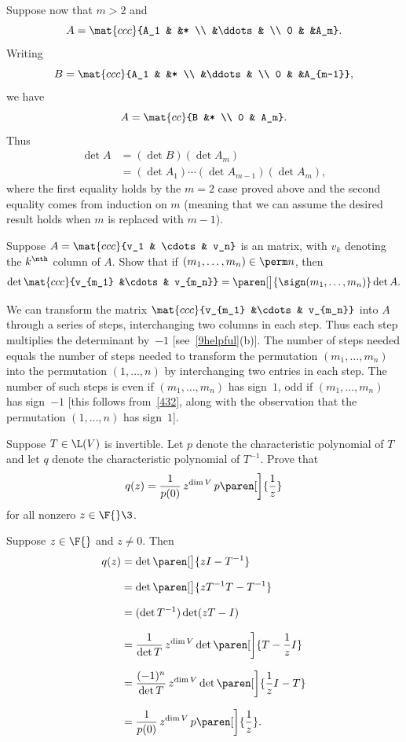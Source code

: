 \begin{Solution}
Suppose now that $m > 2$ and
\[
A = \mat{ccc}{A_1 & &* \\ &\ddots & \\ 0 & &A_m}.
\]
Writing
\[
B = \mat{ccc}{A_1 & &* \\ &\ddots & \\ 0 & &A_{m-1}},
\]
we have
\[
A = \mat{cc}{B &* \\ 0 & A_m}.
\]
Thus
\begin{align*}
\det A &= (\det B)(\det A_m) \\
&= (\det A_1) \dotsm (\det A_{m-1})(\det A_m),
\end{align*}
where the first equality holds by the $m = 2$ case proved above and the second
equality comes from induction on $m$ (meaning that we can assume the desired
result holds when $m$ is replaced with $m-1$).
\end{Solution}

\exercise
Suppose $A = \mat{ccc}{v_1 & \cdots & v_n}$ is an  matrix, with $v_k$ denoting the $k^\nth$ column of $A$. Show that if
$(m_1, \ldots, m_n) \in \perm n$, then
\[
\det \mat{ccc}{v_{m_1} &\cdots & v_{m_n}} = \paren[\big]{\sign(m_1, \ldots, m_n)} \det A.
\]
\exercisedisplayend

\begin{Solution}
We can transform the matrix $\mat{ccc}{v_{m_1} &\cdots & v_{m_n}}$ into $A$ through a series of steps, interchanging two columns in each step. Thus each step multiplies the determinant by~$-1$ [see~\ref{9helpful}(b)].  The number of steps needed equals the number of steps needed to transform the permutation $(m_1, \ldots, m_n)$ into the permutation $(1, \ldots, n)$ by interchanging two entries in each step.  The number of such steps is even if $(m_1, \ldots, m_n)$ has sign~$1$, odd if
$(m_1, \ldots, m_n)$ has sign~$-1$ [this follows from~\ref{432}, along with the observation that the permutation $(1, \ldots, n)$ has sign~$1$].
\end{Solution}

\exercise
Suppose $T \in \L(V)$ is invertible. Let $p$ denote the characteristic polynomial of $T$ and let $q$ denote the characteristic polynomial of $T^{-1}$. Prove that
\[
q(z) = \frac{1}{p(0)}\, z^{\dim V} \, p\paren[\bigg]{\frac{1}{z}}
\]
for all nonzero $z \in \F{}\3$.

\begin{Solution}
Suppose $z \in \F{}$ and $z \ne 0$. Then
\begin{align*}
q(z) &= \det\paren[\big]{zI - T^{-1}} \\[7bp]
&= \det \paren[\big]{ z T^{-1} T - T^{-1} }\\[7bp]
&= (\det T^{-1}) \det(zT - I) \\[7bp]
&= \frac{1}{\det T} \, z^{\dim V} \det \paren[\bigg]{ T - \frac{1}{z} I } \\[7bp]
&= \frac{(-1)^n}{\det T} \, z^{\dim V} \det \paren[\bigg]{ \frac{1}{z} I - T } \\[7bp]
&= \frac{1}{p(0)} \, z^{\dim V} \, p\paren[\bigg]{\frac{1}{z}}.
\end{align*}
\end{Solution}

